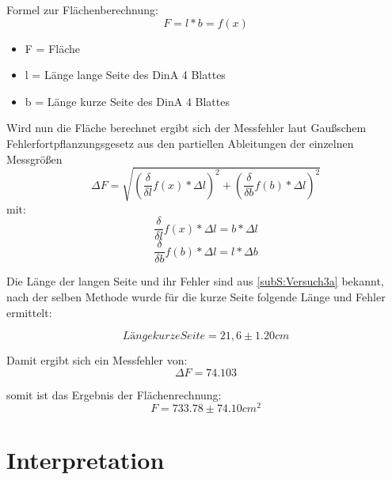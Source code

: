 Formel zur Flächenberechnung:
\begin{equation}
	F = l * b = f(x)
\end{equation}
\begin{itemize}
	\item F = Fläche
	\item l = Länge lange Seite des DinA 4 Blattes
	\item b = Länge kurze Seite des DinA 4 Blattes
\end{itemize}
Wird nun die Fläche berechnet ergibt sich der Messfehler laut Gaußschem Fehlerfortpflanzungsgesetz aus den partiellen Ableitungen der einzelnen Messgrößen
\begin{equation}
	\Delta F = \sqrt{(\frac{\delta}{\delta l}f(x) * \Delta l)^2 + (\frac{\delta}{\delta b}f(b) * \Delta l)^2}
\end{equation}
mit:
\begin{equation}
	\frac{\delta}{\delta l}f(x) * \Delta l = b * \Delta l
\end{equation}
\begin{equation}
	\frac{\delta}{\delta b}f(b) * \Delta l = l * \Delta b
\end{equation}

Die Länge der langen Seite und ihr Fehler sind aus \ref{subS:Versuch3a} bekannt, nach der selben Methode wurde für die kurze Seite folgende Länge und Fehler ermittelt:

\begin{equation}
	Länge kurze Seite = 21,6 \pm 1.20 cm
\end{equation}

Damit ergibt sich ein Messfehler von:
\begin{equation}
	\Delta F = 74.103
\end{equation}

somit ist das Ergebnis der Flächenrechnung:
\begin{equation}
	F = 733.78 \pm 74.10 cm^2
\end{equation}


\section{Interpretation}
\label{chap:VERSUCH_3_INTERPRETATION}
